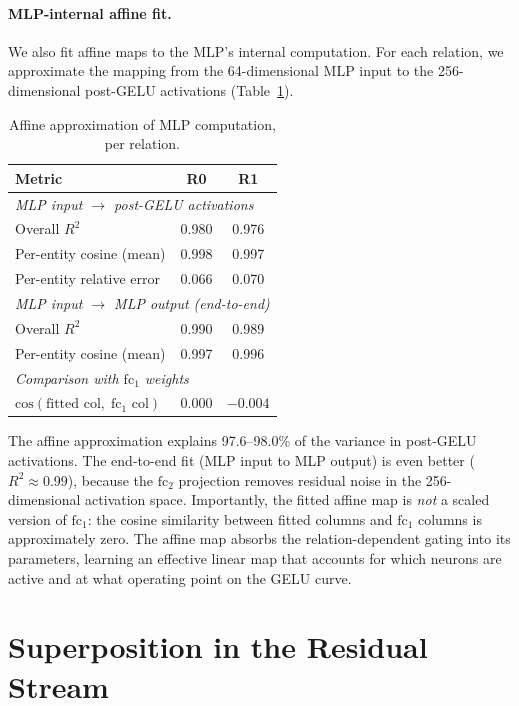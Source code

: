 \documentclass[11pt,a4paper]{article}
\newcommand{\fc}{\mathrm{fc}}
\newcommand{\cosim}{\mathrm{cos}}
\begin{document}
\paragraph{MLP-internal affine fit.}
We also fit affine maps to the MLP's internal computation. For each
relation, we approximate the mapping from the 64-dimensional MLP input
to the 256-dimensional post-GELU activations (Table~\ref{tab:mlp_affine}).

\begin{table}[t]
\centering
\caption{Affine approximation of MLP computation, per relation.}
\label{tab:mlp_affine}
\begin{tabular}{lcc}
\toprule
Metric & R0 & R1 \\
\midrule
\multicolumn{3}{l}{\emph{MLP input $\to$ post-GELU activations}} \\
Overall $R^2$ & 0.980 & 0.976 \\
Per-entity cosine (mean) & 0.998 & 0.997 \\
Per-entity relative error & 0.066 & 0.070 \\
\midrule
\multicolumn{3}{l}{\emph{MLP input $\to$ MLP output (end-to-end)}} \\
Overall $R^2$ & 0.990 & 0.989 \\
Per-entity cosine (mean) & 0.997 & 0.996 \\
\midrule
\multicolumn{3}{l}{\emph{Comparison with $\fc_1$ weights}} \\
$\cosim(\text{fitted col},\; \fc_1\text{ col})$ & 0.000 & $-0.004$ \\
\bottomrule
\end{tabular}
\end{table}

The affine approximation explains 97.6--98.0\% of the variance in
post-GELU activations. The end-to-end fit (MLP input to MLP output)
is even better ($R^2 \approx 0.99$), because the $\fc_2$ projection
removes residual noise in the 256-dimensional activation space.
Importantly, the fitted affine map is \emph{not} a scaled version of
$\fc_1$: the cosine similarity between fitted columns and $\fc_1$
columns is approximately zero. The affine map absorbs the
relation-dependent gating into its parameters, learning an effective
linear map that accounts for which neurons are active and at what
operating point on the GELU curve.

\section{Superposition in the Residual Stream}
\label{sec:superposition}
\end{document}
